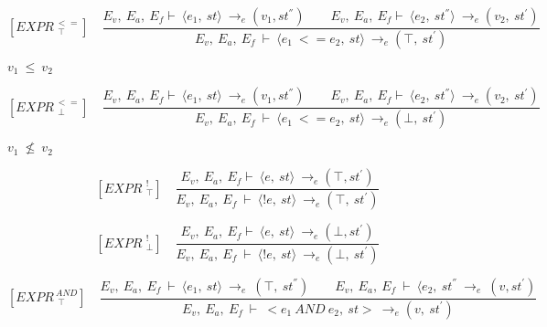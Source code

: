 	
	
	
	
	\[
	[EXPR^{\ <=}_{\ \ \top}] \quad
	\dfrac{E_v, \ E_a, \ E_f \vdash \ \langle e_1, \ st \rangle \ \rightarrow_e (v_1, st^{''}) \qquad E_v, \ E_a, \ E_f \vdash \ \langle e_2, \ st^{''} \rangle \ \rightarrow_e (v_2, \ st^{'})}{E_v, \ E_a, \ E_f \ \vdash \ \langle e_1 \ <= e_2, \ st \rangle \ \rightarrow_e (\top, \ st^{'})}
	\]
	
	
	\begin{math}		
		v_1 \ \le \ v_2		
	\end{math} 
	
	
	
	
	
	
	
	
	\[	
	[EXPR^{\ <=}_{\ \ \bot}] \quad	
	\dfrac{E_v, \ E_a, \ E_f \vdash \ \langle e_1, \ st \rangle \ \rightarrow_e (v_1, st^{''}) \qquad E_v, \ E_a, \ E_f \vdash \ \langle e_2, \ st^{''} \rangle \ \rightarrow_e (v_2, \ st^{'})}{E_v, \ E_a, \ E_f \ \vdash \ \langle e_1 \ <= e_2, \ st \rangle \ \rightarrow_e (\bot, \ st^{'})}	
	\]
	
	
	\begin{math}		
		v_1 \ \nleq \ v_2		
	\end{math}
	
	
	
	
	
	\[	
	[EXPR^{\ \ !}_{\ \ \top}] \quad	
	\dfrac{E_v, \ E_a, \ E_f \vdash \ \langle e, \ st \rangle \ \rightarrow_e (\top, st^{'})}{E_v, \ E_a, \ E_f \ \vdash \ \langle !e, \ st \rangle \ \rightarrow_e (\top, \ st^{'})}	
	\] 
	
	
	
	
	
	\[	
	[EXPR^{\ \ !}_{\ \ \bot}] \quad	
	\dfrac{E_v, \ E_a, \ E_f \vdash \ \langle e, \ st \rangle \ \rightarrow_e (\bot, st^{'})}{E_v, \ E_a, \ E_f \ \vdash \ \langle !e, \ st \rangle \ \rightarrow_e (\bot, \ st^{'})}	
	\]
	
	
	
	
	
	
	
	
	\[	
	[EXPR^{\ AND}_{\ \ \top}] \quad	
	\dfrac{E_v, \ E_a, \ E_f \ \vdash \ \langle e_1, \ st \rangle \ \rightarrow_e \ (\top, \ st^{''}) \qquad E_v, \ E_a, \ E_f \ \vdash \ \langle e_2, \ st^{''} \ \rightarrow_e \ (v, st^{'})}{E_v, \ E_a, \ E_f \ \vdash \ <e_1 \ AND \ e_2, \ st> \ \rightarrow_e (v, \ st^{'})}	
	\] 
	
	
	
	
	
